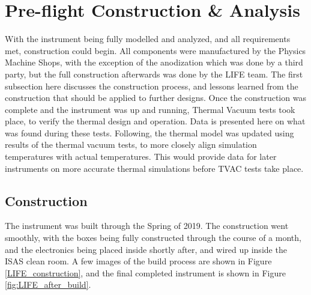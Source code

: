 \section{Pre-flight Construction \& Analysis}\label{preflight_const_analysis}
With the instrument being fully modelled and analyzed, and all requirements met, construction could begin. All components were manufactured by the Physics Machine Shops, with the exception of the anodization which was done by a third party, but the full construction afterwards was done by the LIFE team. The first subsection here discusses the construction process, and lessons learned from the construction that should be applied to further designs. Once the construction was complete and the instrument was up and running, Thermal Vacuum tests took place, to verify the thermal design and operation. Data is presented here on what was found during these tests. Following, the thermal model was updated using results of the thermal vacuum tests, to more closely align simulation temperatures with actual temperatures. This would provide data for later instruments on more accurate thermal simulations before TVAC tests take place. 

\subsection{Construction}\label{construction_sec}
The instrument was built through the Spring of 2019. The construction went smoothly, with the boxes being fully constructed through the course of a month, and the electronics being placed inside shortly after, and wired up inside the ISAS clean room. A few images of the build process are shown in Figure \ref{LIFE_construction}, and the final completed instrument is shown in Figure \ref{fig:LIFE_after_build}.

